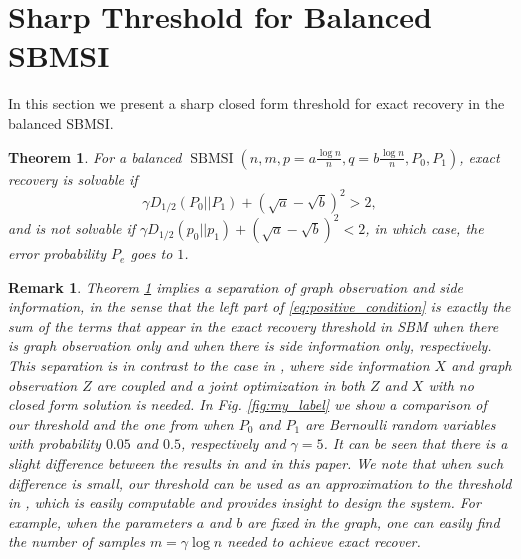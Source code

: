 \documentclass[conference]{IEEEtran}
\newtheorem{theorem}{Theorem}
\newtheorem{remark}{Remark}
\DeclareMathOperator{\SBMSI}{SBMSI}
\begin{document}
	\section{Sharp Threshold for Balanced SBMSI}\label{s:sharp}
	In this section we present a sharp closed form threshold for exact recovery in the balanced SBMSI.  %
	\begin{theorem}\label{thm:Pe}
		For a balanced $\SBMSI(n,m,p=a\frac{\log n}{n},q=b\frac{\log n}{n},P_0,P_1)$, exact recovery is solvable if
		\begin{equation}\label{eq:positive_condition}
			\gamma D_{1/2}(P_0||P_1) + (\sqrt{a} - \sqrt{b})^2 > 2,
		\end{equation}
		and is not solvable if $\gamma D_{1/2}(p_0||p_1) + (\sqrt{a} - \sqrt{b})^2 < 2$, in which case, the error probability $P_e$ goes to $1$.
	\end{theorem}
	\begin{remark}
	Theorem \ref{thm:Pe} implies a separation of graph observation and side information, in the sense that the left part of \eqref{eq:positive_condition} is exactly the sum of the terms that appear in the exact recovery threshold in SBM  when there is graph observation only \cite{abbe2015exact} and when there is side information only, respectively. This separation is in contrast to the case in \cite{abbe17sideinfo}, where side information $X$ and graph observation $Z$ are coupled and a joint optimization in both $Z$ and $X$ with no closed form solution is needed. In Fig. \ref{fig:my_label} we show a comparison of our threshold and the one from \cite{abbe17sideinfo} when $P_0$ and $P_1$ are Bernoulli random variables with probability $ 0.05$ and $0.5$, respectively and $\gamma=5$.  It can be seen that there is a slight difference between the results in \cite{abbe17sideinfo} and in this paper.		We note that when such difference is small, our threshold can be used as an approximation to the threshold in \cite{abbe17sideinfo}, which is easily computable and provides insight to design the system. For example, when the parameters $a$ and $b$ are fixed in the graph, one can easily find the number of samples $m=\gamma\log n$ needed to achieve exact recover. 
	\end{remark}
\end{document}

